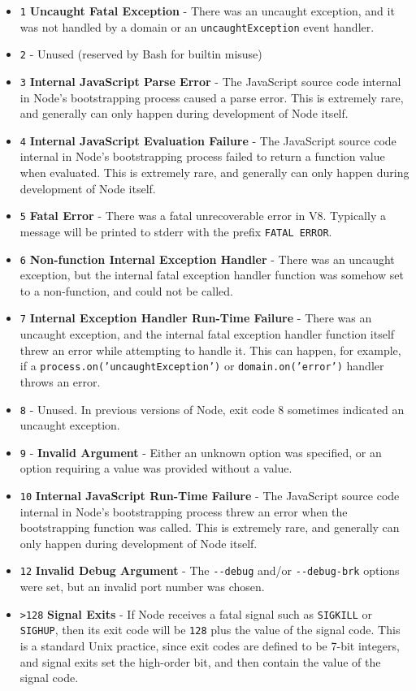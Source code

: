 \begin{itemize}
\itemsep1pt\parskip0pt
\item
  \texttt{1} \textbf{Uncaught Fatal Exception} - There was an uncaught
  exception, and it was not handled by a domain or an
  \texttt{uncaughtException} event handler.
\item
  \texttt{2} - Unused (reserved by Bash for builtin misuse)
\item
  \texttt{3} \textbf{Internal JavaScript Parse Error} - The JavaScript
  source code internal in Node's bootstrapping process caused a parse
  error. This is extremely rare, and generally can only happen during
  development of Node itself.
\item
  \texttt{4} \textbf{Internal JavaScript Evaluation Failure} - The
  JavaScript source code internal in Node's bootstrapping process failed
  to return a function value when evaluated. This is extremely rare, and
  generally can only happen during development of Node itself.
\item
  \texttt{5} \textbf{Fatal Error} - There was a fatal unrecoverable
  error in V8. Typically a message will be printed to stderr with the
  prefix \texttt{FATAL   ERROR}.
\item
  \texttt{6} \textbf{Non-function Internal Exception Handler} - There
  was an uncaught exception, but the internal fatal exception handler
  function was somehow set to a non-function, and could not be called.
\item
  \texttt{7} \textbf{Internal Exception Handler Run-Time Failure} -
  There was an uncaught exception, and the internal fatal exception
  handler function itself threw an error while attempting to handle it.
  This can happen, for example, if a
  \texttt{process.on('uncaughtException')} or
  \texttt{domain.on('error')} handler throws an error.
\item
  \texttt{8} - Unused. In previous versions of Node, exit code 8
  sometimes indicated an uncaught exception.
\item
  \texttt{9} - \textbf{Invalid Argument} - Either an unknown option was
  specified, or an option requiring a value was provided without a
  value.
\item
  \texttt{10} \textbf{Internal JavaScript Run-Time Failure} - The
  JavaScript source code internal in Node's bootstrapping process threw
  an error when the bootstrapping function was called. This is extremely
  rare, and generally can only happen during development of Node itself.
\item
  \texttt{12} \textbf{Invalid Debug Argument} - The \texttt{-{}-debug}
  and/or \texttt{-{}-debug-brk} options were set, but an invalid port
  number was chosen.
\item
  \texttt{\textgreater{}128} \textbf{Signal Exits} - If Node receives a
  fatal signal such as \texttt{SIGKILL} or \texttt{SIGHUP}, then its
  exit code will be \texttt{128} plus the value of the signal code. This
  is a standard Unix practice, since exit codes are defined to be 7-bit
  integers, and signal exits set the high-order bit, and then contain
  the value of the signal code.
\end{itemize}

